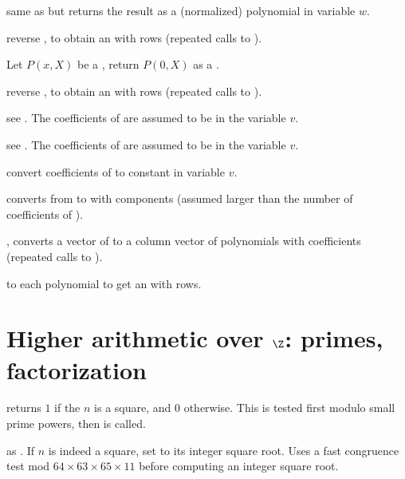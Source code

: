  same as
 but returns the result as a (normalized) polynomial
in variable $w$.

 reverse , to obtain
an  with  rows (repeated calls to ).

 Let $P(x,X)$ be a , return $P(0,X)$
as a .

 reverse , to obtain
an  with  rows (repeated calls to ).

 see .
The coefficients of  are assumed to be in the variable $v$.

 see .
The coefficients of  are assumed to be in the variable $v$.

 convert coefficients of  to
constant  in variable $v$.


 converts from  to 
with  components (assumed larger than the number of coefficients of
).

, converts a vector of  to a column
vector of polynomials with  coefficients (repeated calls to
).



  to each polynomial
to get an  with  rows.

\section{Higher arithmetic over $\Z$: primes, factorization}


 returns $1$ if the  $n$ is
a square, and $0$ otherwise. This is tested first modulo small prime
powers, then  is called.

 as . If
$n$ is indeed a square, set  to its integer square root.
Uses a fast congruence test mod $64\times 63\times 65\times 11$ before
computing an integer square root.

